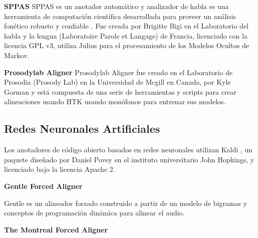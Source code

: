 \textbf{SPPAS}
SPPAS es un anotador automático y analizador de habla es una herramienta de computación científica desarrollada para proveer un análisis fonético robusto y confiable \cite{Bigi2016ASPPAS}. Fue creada por Brigitte Bigi  en el Laboratorio del habla y la lengua (Laboratoire Parole et Langage) de Francia, licenciado con la licencia GPL v3, utiliza Julius para el procesamiento de los Modelos Ocultos de Markov.

\textbf{Prosodylab Aligner}
Prosodylab Aligner \cite{Gorman2011Prosodylab-aligner:Speech} fue creado en el Laboratorio de Prosodia (Prosody Lab) en la Universidad de Mcgill en Canada, por Kyle Gorman y está compuesta de una serie de herramientas y scripts para crear alineaciones usando HTK usando monófonos para entrenar sus modelos.

\subsection{Redes Neuronales Artificiales}

Los anotadores de código abierto basados en redes neuronales utilizan Kaldi \cite{Povey_ASRU2011}, un paquete diseñado por Daniel Povey en el instituto universitario John Hopkings, y licenciado bajo la licencia Apache 2.

\textbf{Gentle Forced Aligner}

Gentle \cite{gentle} es un alineador forzado construido a partir de un modelo de bigramas y conceptos de programación dinámica para alinear el audio.

\textbf{The Montreal Forced Aligner}

